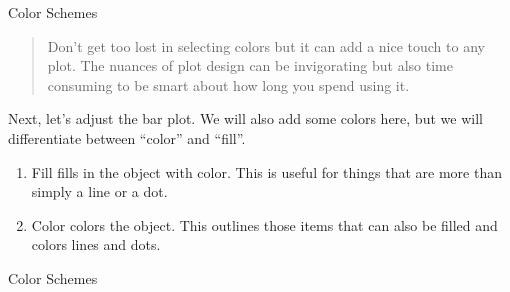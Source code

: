 \begin{frame}{Color Schemes}

\begin{quote}
Don't get too lost in selecting colors but it can add a nice touch to
any plot. The nuances of plot design can be invigorating but also time
consuming to be smart about how long you spend using it.
\end{quote}

Next, let's adjust the bar plot. We will also add some colors here, but
we will differentiate between ``color'' and ``fill''.

\begin{enumerate}
\def\labelenumi{\arabic{enumi}.}
\tightlist
\item
  Fill fills in the object with color. This is useful for things that
  are more than simply a line or a dot.
\item
  Color colors the object. This outlines those items that can also be
  filled and colors lines and dots.
\end{enumerate}

\end{frame}

\begin{frame}[fragile]{Color Schemes}

\begin{Shaded}
\begin{Highlighting}[]
\StringTok{ }\NormalTok{(}\NormalTok{)}
\NormalTok{(}
                        \OperatorTok{+}
\StringTok{  }\NormalTok{(}\NormalTok{(}
            \NormalTok{, }
           \NormalTok{) }\OperatorTok{+}
\StringTok{  }\NormalTok{(}\NormalTok{(}\OperatorTok{-}\StringTok{ }
                    \OperatorTok{+}\StringTok{ }
                \NormalTok{) }\OperatorTok{+}
\StringTok{  }\NormalTok{(} \NormalTok{(}\NormalTok{, }
                                \NormalTok{)) }\OperatorTok{+}\StringTok{ }
\StringTok{  }\NormalTok{(} \NormalTok{(}\NormalTok{, }\NormalTok{))}
\end{Highlighting}
\end{Shaded}

\end{frame}


